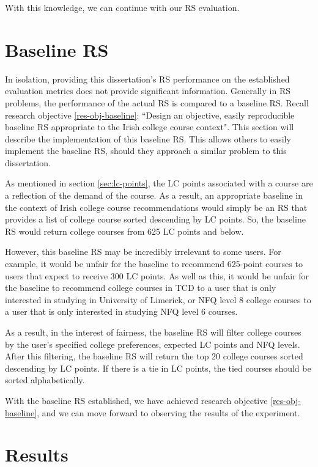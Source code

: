 With this knowledge, we can continue with our RS evaluation.

\section{Baseline RS}
\label{sec:baseline-rs}

In isolation, providing this dissertation's RS performance on the established evaluation metrics
does not provide significant information.
Generally in RS problems, the performance of the actual RS is compared to a baseline RS.
Recall research objective \ref{res-obj-baseline}: ``Design an objective, easily reproducible baseline RS appropriate to the Irish college course context".
This section will describe the implementation of this baseline RS.
This allows others to easily implement the baseline RS,
should they approach a similar problem to this dissertation.

As mentioned in section \ref{sec:lc-points}, the LC points associated with a course are a reflection of the 
demand of the course. As a result,
an appropriate baseline in the context of Irish college course recommendations would 
simply be an RS that provides a list of college course sorted descending by LC points.
So, the baseline RS would return college courses from 625 LC points and below.

However, this baseline RS may be incredibly irrelevant to some users.
For example, it would be unfair for the baseline to recommend 625-point courses 
to users that expect to receive 300 LC points.
As well as this, it would be unfair for the baseline to recommend 
college courses in TCD to a user that is only interested 
in studying in University of Limerick,
or NFQ level 8 college courses to a user that is only interested in studying NFQ level 6 courses.

As a result, in the interest of fairness, the baseline RS will filter college courses by the user's specified 
college preferences, expected LC points and NFQ levels.
After this filtering, the baseline RS will return the top 20 college courses sorted descending by LC 
points.
If there is a tie in LC points, the tied courses should be sorted alphabetically.

With the baseline RS established, we have achieved research objective \ref{res-obj-baseline},
and we can move forward to observing the results of the experiment.

\section{Results}
\label{sec:results}

